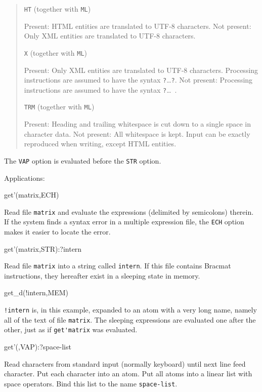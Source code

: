 \documentclass[12pt]{article}
\newcommand{\bc}[1]{\texttt{#1}}
\begin{document}
\begin{quote}
\begin{description}
  \item \bc{HT} (together with \bc{ML})\par
    Present: HTML entities are translated to UTF-8 characters. Not
    present: Only XML entities are translated to UTF-8 characters.
  \item \bc{X} (together with \bc{ML})\par
    Present: Only XML entities are translated to UTF-8
    characters. Processing instructions are assumed to have the syntax
    \bc?\ldots\bc?. Not present: Processing instructions are assumed
    to have the syntax \bc?\ldots\ .
  \item \bc{TRM} (together with \bc{ML})\par
    Present: Heading and trailing whitespace is cut down to a single
    space in character data. Not present: All whitespace is
    kept. Input can be exactly reproduced when writing, except
    HTML entities.
  \end{description}
\end{quote}

The \bc{VAP} option is evaluated before the \bc{STR} option.

Applications:
\begin{v}
get'(matrix,ECH)
\end{v}
Read file \bc{matrix} and evaluate the expressions (delimited by
semicolons) therein. If the system finds a syntax error in a multiple
expression file, the \bc{ECH} option makes it easier to locate the
error.

\begin{v}
get'(matrix,STR):?intern
\end{v}
Read file \bc{matrix} into a string called \bc{intern}. If this file
contains Bracmat instructions, they hereafter exist in a sleeping
state in memory.

\begin{v}
get_d(!intern,MEM)
\end{v}
\bc{!intern} is, in this example, expanded to an atom with a very long
name, namely all of the text of file \bc{matrix}. The sleeping
expressions are evaluated one after the other, just as if
\verb|get'matrix| was evaluated.

\begin{v}
get'(,VAP):?space-list
\end{v}
Read characters from standard input (normally keyboard) until next
line feed character. Put each character into an atom. Put all atoms
into a linear list with space operators. Bind this list to the name
\bc{space-list}.
\end{document}

